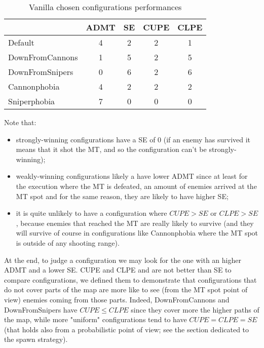 \documentclass[
10pt, %
a4paper, %
oneside, %
headinclude,footinclude, %
BCOR5mm, %
]{scrartcl}
\begin{document}
			\begin{table}[h!]
				\centering
				\begin{tabular}{||l|c|c|c|c||}
					\hline
					& ADMT & SE & CUPE & CLPE \\
					\hline
					Default 		& 4 & 2 & 2 & 1 \\ \hline
					DownFromCannons & 1 & 5 & 2 & 5 \\ \hline
					DownFromSnipers & 0 & 6 & 2 & 6 \\ \hline
					Cannonphobia 	& 4 & 2 & 2 & 2 \\ \hline
					Sniperphobia 	& 7 & 0 & 0 & 0 \\ \hline
				\end{tabular}
				\caption{Vanilla chosen configurations performances}
			\end{table}
			Note that:
			\begin{itemize}
				\item strongly-winning configurations have a SE of 0 (if an enemy has survived it means that it shot the MT, and so the configuration can't be strongly-winning);
				\item weakly-winning configurations likely a have lower ADMT since at least for the execution where the MT is defeated, an amount of enemies arrived at the MT spot and for the same reason, they are likely to have higher SE;
				\item it is quite unlikely to have a configuration where $CUPE>SE$ or $CLPE>SE$, because enemies that reached the MT are really likely to survive (and they will survive of course in configurations like Cannonphobia where the MT spot is outside of any shooting range).
			\end{itemize}
			At the end, to judge a configuration we may look for the one with an higher ADMT and a lower SE. CUPE and CLPE and are not better than SE to compare configurations, we defined them to demonstrate that configurations that do not cover parts of the map are more like to see (from the MT spot point of view) enemies coming from those parts. Indeed, DownFromCannons and DownFromSnipers have $CUPE\leq CLPE$ since they cover more the higher paths of the map, while more "uniform" configurations tend to have $CUPE=CLPE=SE$ (that holds also from a probabilistic point of view; see the section dedicated to the spawn strategy).
\end{document}
